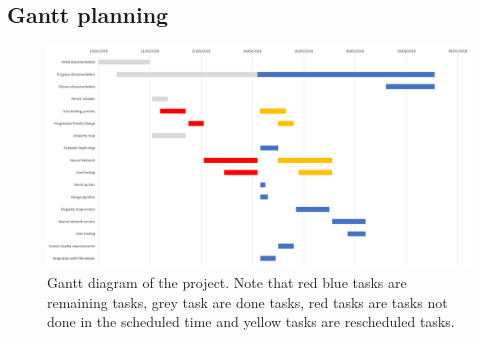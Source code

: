 \documentclass[10pt,a4paper,twocolumn,twoside]{article}
\begin{document}
	\begin{landscape}
		\section{Gantt planning}
		\begin{figure}[b!]
			\centering
			\includegraphics[width=1\linewidth]{img/gantt2}
			\caption{Gantt diagram of the project. Note that red blue tasks are remaining tasks, grey task are done tasks, red tasks are tasks not done in the scheduled time and yellow tasks are rescheduled tasks.}
			\label{fig:gantt}
		\end{figure}
		
	\end{landscape}
	
	
	
	
\end{document}

